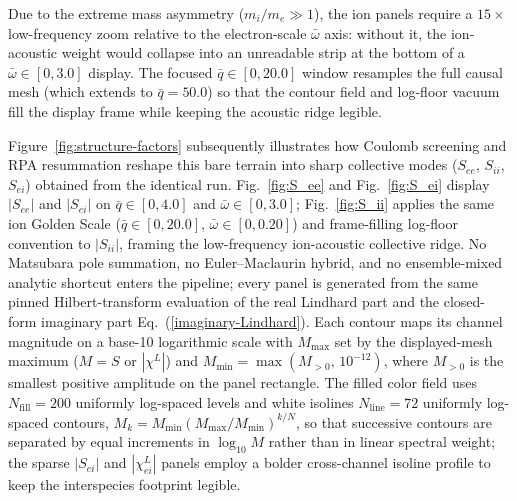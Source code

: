 \documentclass[aps,showkeys,noshowpacs,superscriptaddress,pre,preprint]{revtex4-2}
\begin{document}
Due to the extreme mass asymmetry ($m_i/m_e \gg 1$), the ion panels require a $15\times$ low-frequency zoom relative to the electron-scale $\bar{\omega}$ axis: without it, the ion-acoustic weight would collapse into an unreadable strip at the bottom of a $\bar{\omega} \in [0, 3.0]$ display.
The focused $\bar{q} \in [0, 20.0]$ window resamples the full causal mesh (which extends to $\bar{q} = 50.0$) so that the contour field and log-floor vacuum fill the display frame while keeping the acoustic ridge legible.

Figure~\ref{fig:structure-factors} subsequently illustrates how Coulomb screening and RPA resummation reshape this bare terrain into sharp collective modes ($S_{ee}$, $S_{ii}$, $S_{ei}$)
obtained from the identical run.
Fig.~\ref{fig:S_ee} and Fig.~\ref{fig:S_ei} display $|S_{ee}|$ and $|S_{ei}|$ on $\bar{q} \in [0, 4.0]$ and $\bar{\omega} \in [0, 3.0]$;
Fig.~\ref{fig:S_ii} applies the same ion Golden Scale ($\bar{q} \in [0, 20.0]$, $\bar{\omega} \in [0, 0.20]$) and frame-filling log-floor convention to $|S_{ii}|$, framing the low-frequency ion-acoustic collective ridge.
No Matsubara pole summation, no Euler--Maclaurin hybrid, and no ensemble-mixed analytic shortcut enters the pipeline;
every panel is generated from the same pinned Hilbert-transform evaluation of the real Lindhard part
and the closed-form imaginary part Eq.~(\ref{imaginary-Lindhard}).
Each contour maps its channel magnitude on a base-10 logarithmic scale with
$M_{\max}$ set by the displayed-mesh maximum ($M=S$ or $|\chi^L|$) and
$M_{\min}=\max\!\left(M_{>0},\,10^{-12}\right)$,
where $M_{>0}$ is the smallest positive amplitude on the panel rectangle.
The filled color field uses $N_{\mathrm{fill}}=200$ uniformly log-spaced levels and white isolines
$N_{\mathrm{line}}=72$ uniformly log-spaced contours,
$M_k = M_{\min}\left(M_{\max}/M_{\min}\right)^{k/N}$,
so that successive contours are separated by equal increments in $\log_{10} M$
rather than in linear spectral weight; the sparse $|S_{ei}|$ and $|\chi_{ei}^L|$ panels employ a bolder cross-channel isoline profile to keep the interspecies footprint legible.
\end{document}
